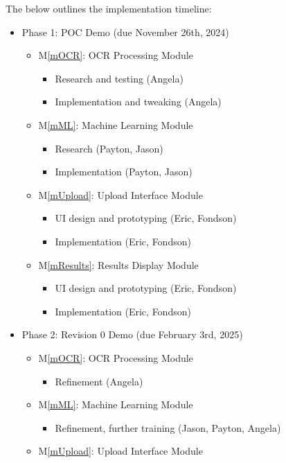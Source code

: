 \documentclass[12pt, titlepage]{article}
\newcommand{\mref}[1]{M\ref{#1}}
\begin{document}
\noindent The below outlines the implementation timeline:
\begin{itemize}
	\item Phase 1: POC Demo (due November 26th, 2024)
	\begin{itemize}
		\item \mref{mOCR}: OCR Processing Module 
		\begin{itemize}
			\item Research and testing (Angela)
			\item Implementation and tweaking (Angela)
		\end{itemize}
		\item \mref{mML}: Machine Learning Module
		\begin{itemize}
			\item Research (Payton, Jason)
			\item Implementation (Payton, Jason)
		\end{itemize}
		\item \mref{mUpload}: Upload Interface Module
		\begin{itemize}
			\item UI design and prototyping (Eric, Fondson)
			\item Implementation (Eric, Fondson)
		\end{itemize}
		\item \mref{mResults}: Results Display Module
		\begin{itemize}
			\item UI design and prototyping (Eric, Fondson)
			\item Implementation (Eric, Fondson)
		\end{itemize}
	\end{itemize}
	\item Phase 2: Revision 0 Demo (due February 3rd, 2025)
	\begin{itemize}
		\item \mref{mOCR}: OCR Processing Module
		\begin{itemize}
			\item Refinement (Angela)
		\end{itemize}
		\item \mref{mML}: Machine Learning Module
		\begin{itemize}
			\item Refinement, further training (Jason, Payton, Angela)
		\end{itemize}
		\item \mref{mUpload}: Upload Interface Module
		\begin{itemize}

\end{itemize}
\end{itemize}
\end{itemize}
\end{document}
